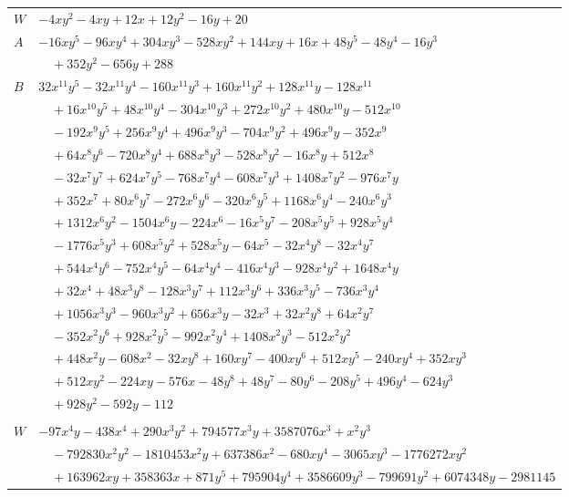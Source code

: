 \documentclass[11pt]{article}
\begin{document}
\begin{longtable}{@{}ll@{}}
$W$ & $-4xy^{2}-4xy+12x+12y^{2}-16y+20$\\
$A$ & $-16xy^{5}-96xy^{4}+304xy^{3}-528xy^{2}+144xy+16x+48y^{5}-48y^{4}-16y^{3}$\\
 & $\quad +352y^{2}-656y+288$\\
$B$ & $32x^{11}y^{5}-32x^{11}y^{4}-160x^{11}y^{3}+160x^{11}y^{2}+128x^{11}y-128x^{11}$\\
 & $\quad +16x^{10}y^{5}+48x^{10}y^{4}-304x^{10}y^{3}+272x^{10}y^{2}+480x^{10}y-512x^{10}$\\
 & $\quad -192x^{9}y^{5}+256x^{9}y^{4}+496x^{9}y^{3}-704x^{9}y^{2}+496x^{9}y-352x^{9}$\\
 & $\quad +64x^{8}y^{6}-720x^{8}y^{4}+688x^{8}y^{3}-528x^{8}y^{2}-16x^{8}y+512x^{8}$\\
 & $\quad -32x^{7}y^{7}+624x^{7}y^{5}-768x^{7}y^{4}-608x^{7}y^{3}+1408x^{7}y^{2}-976x^{7}y$\\
 & $\quad +352x^{7}+80x^{6}y^{7}-272x^{6}y^{6}-320x^{6}y^{5}+1168x^{6}y^{4}-240x^{6}y^{3}$\\
 & $\quad +1312x^{6}y^{2}-1504x^{6}y-224x^{6}-16x^{5}y^{7}-208x^{5}y^{5}+928x^{5}y^{4}$\\
 & $\quad -1776x^{5}y^{3}+608x^{5}y^{2}+528x^{5}y-64x^{5}-32x^{4}y^{8}-32x^{4}y^{7}$\\
 & $\quad +544x^{4}y^{6}-752x^{4}y^{5}-64x^{4}y^{4}-416x^{4}y^{3}-928x^{4}y^{2}+1648x^{4}y$\\
 & $\quad +32x^{4}+48x^{3}y^{8}-128x^{3}y^{7}+112x^{3}y^{6}+336x^{3}y^{5}-736x^{3}y^{4}$\\
 & $\quad +1056x^{3}y^{3}-960x^{3}y^{2}+656x^{3}y-32x^{3}+32x^{2}y^{8}+64x^{2}y^{7}$\\
 & $\quad -352x^{2}y^{6}+928x^{2}y^{5}-992x^{2}y^{4}+1408x^{2}y^{3}-512x^{2}y^{2}$\\
 & $\quad +448x^{2}y-608x^{2}-32xy^{8}+160xy^{7}-400xy^{6}+512xy^{5}-240xy^{4}+352xy^{3}$\\
 & $\quad +512xy^{2}-224xy-576x-48y^{8}+48y^{7}-80y^{6}-208y^{5}+496y^{4}-624y^{3}$\\
 & $\quad +928y^{2}-592y-112$\\
\addlinespace[3pt]
\multicolumn{2}{@{}l}{$i=10$, $m=756$, neighbours $7,25,30,38,46,49,68,69,79,81,90,101$}\\
$W$ & $-97x^{4}y-438x^{4}+290x^{3}y^{2}+794577x^{3}y+3587076x^{3}+x^{2}y^{3}$\\
 & $\quad -792830x^{2}y^{2}-1810453x^{2}y+637386x^{2}-680xy^{4}-3065xy^{3}-1776272xy^{2}$\\
 & $\quad +163962xy+358363x+871y^{5}+795904y^{4}+3586609y^{3}-799691y^{2}+6074348y-2981145$\\

\end{longtable}
\end{document}
